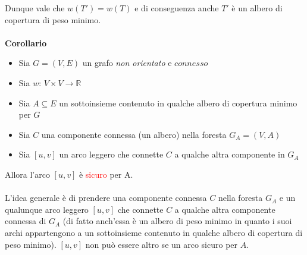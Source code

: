 \documentclass[../cheatSheetAlgoritmi.tex]{subfiles}
\begin{document}
Dunque vale che $w(T') = w(T)$ e di conseguenza anche $T'$ è un albero di copertura di peso minimo.\\\\
\textbf{Corollario}
\begin{itemize}
	\item Sia $G = (V, E)$ un grafo \emph{non orientato} e $connesso$
	\item Sia $w$: $V \times V \rightarrow \mathbb{R}$
	\item Sia $A \subseteq E$ un sottoinsieme contenuto in qualche albero di copertura minimo per $G$
	\item Sia $C$ una componente connessa (un albero) nella foresta $G_{A} = (V, A)$
	\item Sia $[u, v]$ un arco leggero che connette $C$ a qualche altra componente in $G_{A}$
\end{itemize}
Allora l'arco $[u, v]$ è \textcolor{red}{sicuro} per A.\\\\
L'idea generale è di prendere una componente connessa $C$ nella foresta $G_{A}$ e un qualunque arco leggero $[u, v]$ che connette $C$ a qualche altra componente connessa di $G_{A}$ (di fatto anch'essa è un albero di peso minimo in quanto i suoi archi appartengono a un sottoinsieme contenuto in qualche albero di copertura di peso minimo). $[u, v]$ non può essere altro se un arco sicuro per $A$.
\newpage
\end{document}
